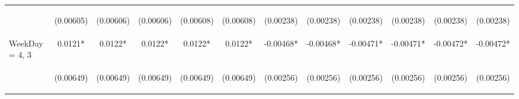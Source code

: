 \documentclass[]{article}
\begin{document}
\begin{center}
\begin{tabular}{lccccccccccc}
\vspace{4pt} & \begin{footnotesize}(0.00605)\end{footnotesize} & \begin{footnotesize}(0.00606)\end{footnotesize} & \begin{footnotesize}(0.00606)\end{footnotesize} & \begin{footnotesize}(0.00608)\end{footnotesize} & \begin{footnotesize}(0.00608)\end{footnotesize} & \begin{footnotesize}(0.00238)\end{footnotesize} & \begin{footnotesize}(0.00238)\end{footnotesize} & \begin{footnotesize}(0.00238)\end{footnotesize} & \begin{footnotesize}(0.00238)\end{footnotesize} & \begin{footnotesize}(0.00238)\end{footnotesize} & \begin{footnotesize}(0.00238)\end{footnotesize} \\
WeekDay = 4, 3 & 0.0121* & 0.0122* & 0.0122* & 0.0122* & 0.0122* & -0.00468* & -0.00468* & -0.00471* & -0.00471* & -0.00472* & -0.00472* \\
\vspace{4pt} & \begin{footnotesize}(0.00649)\end{footnotesize} & \begin{footnotesize}(0.00649)\end{footnotesize} & \begin{footnotesize}(0.00649)\end{footnotesize} & \begin{footnotesize}(0.00649)\end{footnotesize} & \begin{footnotesize}(0.00649)\end{footnotesize} & \begin{footnotesize}(0.00256)\end{footnotesize} & \begin{footnotesize}(0.00256)\end{footnotesize} & \begin{footnotesize}(0.00256)\end{footnotesize} & \begin{footnotesize}(0.00256)\end{footnotesize} & \begin{footnotesize}(0.00256)\end{footnotesize} & \begin{footnotesize}(0.00256)\end{footnotesize} \\

\end{tabular}
\end{center}
\end{document}
